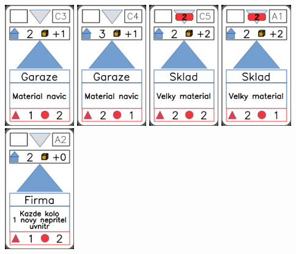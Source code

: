 \documentclass[a4paper]{article}
\begin{document}
	\includegraphics[width=3.0cm]{img-3_12}
	\includegraphics[width=3.0cm]{img-3_13}
	\includegraphics[width=3.0cm]{img-3_14}
	\includegraphics[width=3.0cm]{img-3_15}
	\includegraphics[width=3.0cm]{img-3_16}
\end{document}
